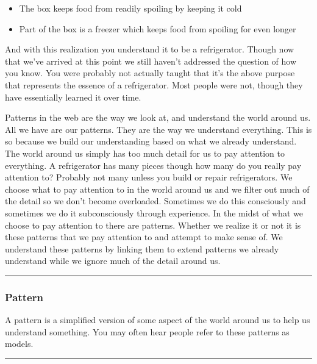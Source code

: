 \documentclass[]{memoir}
\begin{document}
\begin{itemize}
\itemsep1pt\parskip0pt
\item
  The box keeps food from readily spoiling by keeping it cold
\item
  Part of the box is a freezer which keeps food from spoiling for even
  longer
\end{itemize}

And with this realization you understand it to be a refrigerator. Though
now that we've arrived at this point we still haven't addressed the
question of how you know. You were probably not actually taught that
it's the above purpose that represents the essence of a refrigerator.
Most people were not, though they have essentially learned it over time.

Patterns in the web are the way we look at, and understand the world
around us. All we have are our patterns. They are the way we understand
everything. This is so because we build our understanding based on what
we already understand. The world around us simply has too much detail
for us to pay attention to everything. A refrigerator has many pieces
though how many do you really pay attention to? Probably not many unless
you build or repair refrigerators. We choose what to pay attention to in
the world around us and we filter out much of the detail so we don't
become overloaded. Sometimes we do this consciously and sometimes we do
it subconsciously through experience. In the midst of what we choose to
pay attention to there are patterns. Whether we realize it or not it is
these patterns that we pay attention to and attempt to make sense of. We
understand these patterns by linking them to extend patterns we already
understand while we ignore much of the detail around us.

\begin{center}\rule{3in}{0.4pt}\end{center}

\subsubsection{Pattern}

A pattern is a simplified version of some aspect of the world around us
to help us understand something. You may often hear people refer to
these patterns as models.

\begin{center}\rule{3in}{0.4pt}\end{center}
\end{document}
